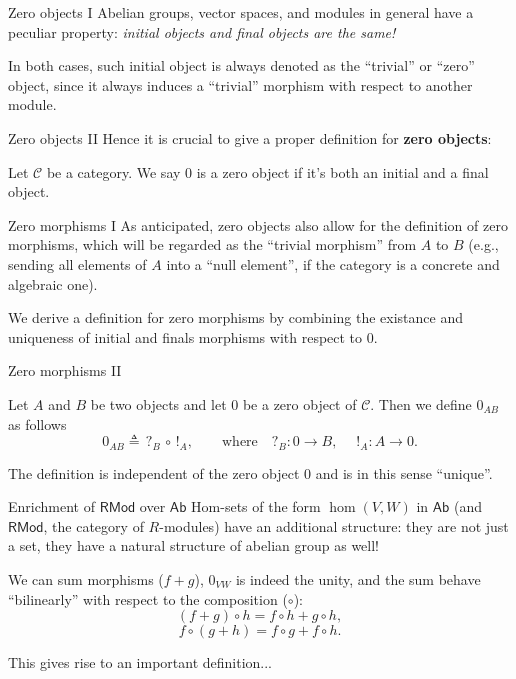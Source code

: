\documentclass{beamer}
\newcommand{\cat}[1]{\mathsf{#1}}
\begin{document}
\begin{frame}{Zero objects I}
    Abelian groups, vector spaces, and modules in general have a peculiar property: \textit{initial objects and
    final objects are the same!} \medskip
    
    In both cases, such initial object is always
    denoted as the ``trivial'' or ``zero'' object, since it always induces a
    ``trivial'' morphism with respect to another module.
\end{frame}

\begin{frame}{Zero objects II}
    Hence it is crucial to give a proper definition for \textbf{zero objects}: \medskip
    
    \begin{definition}
        Let $\mathcal{C}$ be a category. We say $0$ is a
        zero object if it's both an initial and
        a final object.
    \end{definition}
\end{frame}

\begin{frame}{Zero morphisms I}
    As anticipated, zero objects also allow for the
    definition of zero morphisms, which will be regarded as the
    ``trivial morphism'' from $A$ to $B$ (e.g., sending all elements
    of $A$ into a ``null element'', if the category is a concrete and
    algebraic one). \medskip

    We derive a definition for zero morphisms
    by combining the existance and uniqueness of initial and finals morphisms
    with respect to $0$.
\end{frame}

\begin{frame}{Zero morphisms II}
    \begin{definition}
        Let $A$ and $B$ be two objects and let $0$ be a zero
        object of $\mathcal{C}$. Then we define $0_{AB}$ as
        follows
        \[
            0_{AB} \triangleq \, ?_{B} \, \circ \, !_{A}, \qquad \text{where} \quad ?_B : 0 \to B, \quad\; !_A : A \to 0.
        \]
    \end{definition}

    The definition is independent of the zero object $0$ and is
    in this sense ``unique''.
\end{frame}

\begin{frame}{Enrichment of \texorpdfstring{$\cat{RMod}$}{RMod} over \texorpdfstring{$\cat{Ab}$}{Ab}}
    Hom-sets of the form $\hom(V, W)$ in $\cat{Ab}$ (and $\cat{RMod}$, the category
    of $R$-modules) have an additional
    structure: they are not just a set, they have a natural structure
    of abelian group as well! \medskip

    We can sum morphisms ($f + g$), $0_{VW}$ is indeed the unity,
    and the sum behave
    ``bilinearly'' with respect to the composition ($\circ$):
    \[
        (f + g) \circ h = f \circ h + g \circ h,
    \]
    \[
        f \circ (g + h) = f \circ g + f \circ h.
    \]

    This gives rise to an important definition...
\end{frame}
\end{document}
